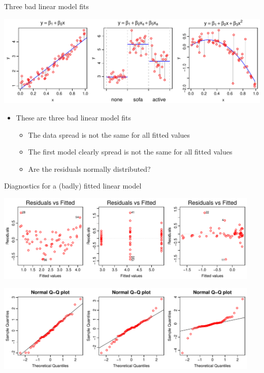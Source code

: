 \documentclass[xcolor=x11names,compress]{beamer}
\renewcommand{\(}{\begin{columns}}
\renewcommand{\)}{\end{columns}}
\newcommand{\<}[1]{\begin{column}{#1}}
\renewcommand{\>}{\end{column}}
\begin{document}

\begin{frame}{Three bad linear model fits}

\includegraphics[width=\textwidth]{NonConstantVarianceMods.pdf}

\begin{itemize}\itemsep6pt
\item These are three bad linear model fits
\pause 
\begin{itemize}[<+->]\itemsep6pt
    \item The data spread is not the same for all fitted values
    \item The first model clearly  spread is not the same for all fitted values
    \item Are the residuals normally distributed?
\end{itemize}
\end{itemize}

\end{frame}


\begin{frame}{Diagnostics for a (badly) fitted linear model}

\includegraphics[width=0.95\textwidth]{BadFitResid.pdf}

\pause

\includegraphics[width=0.95\textwidth]{BadQQNorm.pdf}


\end{frame}
\end{document}
